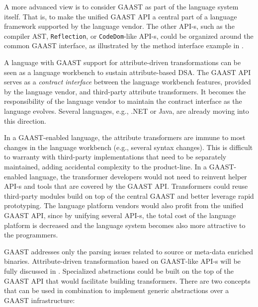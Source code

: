 \begin{itemize}
A more advanced view is to consider GAAST as part of the language system itself. That is, to make the unified GAAST API a central part of a language framework supported by the language vendor. The other API-s, such as the compiler AST, {\tt Reflection}, or {\tt CodeDom}-like API-s, could be organized around the common GAAST interface, as illustrated by the method interface example in .

A language with GAAST support for attribute-driven transformations can be seen as a language workbench \cite{lang.workbench} to sustain attribute-based DSA. The GAAST API serves as a \textit{contract interface} between the language workbench features, provided by the language vendor, and third-party attribute transformers. It becomes the responsibility of the language vendor to maintain the contract interface as the language evolves. Several languages, e.g., .NET or Java, are already moving into this direction.

In a GAAST-enabled language, the attribute transformers are immune to most changes in the language workbench (e.g., several syntax changes). This is difficult to warranty with third-party implementations that need to be separately maintained, adding accidental complexity to the product-line. In a GAAST-enabled language, the transformer developers would not need to reinvent helper API-s and tools that are covered by the GAAST API. Transformers could reuse third-party modules build on top of the central GAAST and better leverage rapid prototyping. The language platform vendors would also profit from the unified GAAST API, since by unifying several API-s, the total cost of the language platform is decreased and the language system becomes also more attractive to the programmers.

\end{itemize}

\noindent GAAST addresses only the parsing issues related to source or meta-data enriched binaries. Attribute-driven transformation based on GAAST-like API-s will be fully discussed in . Specialized abstractions could be built on the top of the GAAST API that would facilitate building transformers. There are two concepts that can be used in combination to implement generic abstractions over a GAAST infrastructure:

